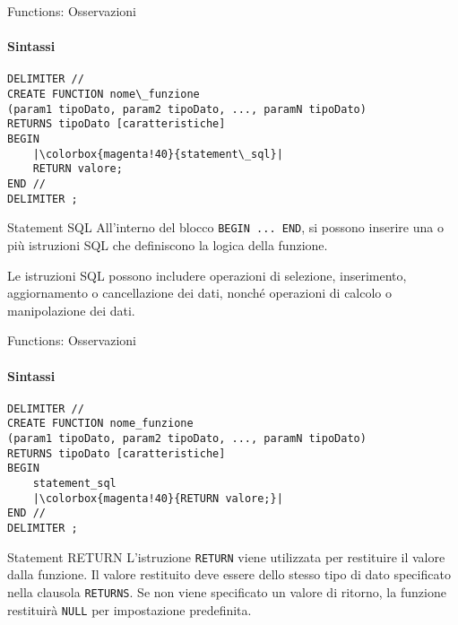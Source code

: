 \begin{frame}[fragile]{Functions: Osservazioni}
\framesubtitle{Sintassi}
\vspace{-.8cm}
\begin{lstlisting}
DELIMITER //
CREATE FUNCTION nome\_funzione
(param1 tipoDato, param2 tipoDato, ..., paramN tipoDato)
RETURNS tipoDato [caratteristiche]
BEGIN
    |\colorbox{magenta!40}{statement\_sql}|
    RETURN valore;
END //
DELIMITER ;
\end{lstlisting}

\vspace{-.4cm}

\begin{minipage}{\textwidth}
    \begin{block}{Statement SQL}
    All'interno del blocco \texttt{BEGIN ... END}, si possono inserire una o pi\`u istruzioni SQL che definiscono la logica della funzione.
    
    Le istruzioni SQL possono includere operazioni di selezione, inserimento, aggiornamento o cancellazione dei dati, nonch\'e operazioni di calcolo o manipolazione dei dati.
    \end{block}
    \end{minipage}
\end{frame}
%
\begin{frame}[fragile]{Functions: Osservazioni}
\framesubtitle{Sintassi}
\vspace{-.8cm}
\begin{lstlisting}
DELIMITER //
CREATE FUNCTION nome_funzione
(param1 tipoDato, param2 tipoDato, ..., paramN tipoDato)
RETURNS tipoDato [caratteristiche]
BEGIN
    statement_sql
    |\colorbox{magenta!40}{RETURN valore;}|
END //
DELIMITER ;
\end{lstlisting}

\vspace{-.4cm}

\begin{minipage}{\textwidth}
    \begin{block}{Statement RETURN}
    L'istruzione \texttt{RETURN} viene utilizzata per restituire il valore dalla funzione.
    Il valore restituito deve essere dello stesso tipo di dato specificato nella clausola \texttt{RETURNS}.
    Se non viene specificato un valore di ritorno, la funzione restituir\`a \texttt{NULL} per impostazione predefinita.
    \end{block}
    \end{minipage}
\end{frame}
%
